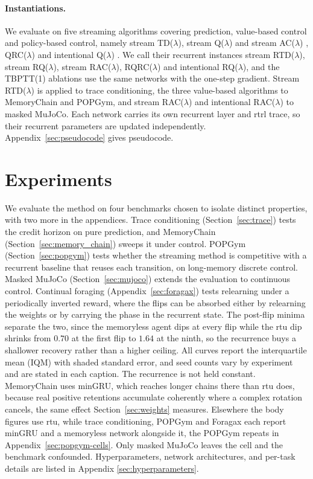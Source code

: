 \documentclass{article}
\begin{document}
\paragraph{Instantiations.} We evaluate on five streaming algorithms covering prediction,
value-based control and policy-based control, namely stream TD($\lambda$), stream Q($\lambda$) and
stream AC($\lambda$) \citep{elsayed2024streaming}, QRC($\lambda$) \citep{elelimy2025deep} and
intentional Q($\lambda$) \citep{sharifnassab2026intentional}. We call their recurrent instances
stream RTD($\lambda$), stream RQ($\lambda$), stream RAC($\lambda$), RQRC($\lambda$) and
intentional RQ($\lambda$), and the TBPTT(1) ablations use the same networks with the one-step
gradient.
Stream RTD($\lambda$) is applied to trace conditioning, the three value-based algorithms to
MemoryChain and POPGym, and stream
RAC($\lambda$) and intentional RAC($\lambda$) to masked MuJoCo. Each network carries its own recurrent layer and \gls{rtrl} trace, so their recurrent
parameters are updated independently. Appendix~\ref{sec:pseudocode} gives pseudocode.

\section{Experiments}
\label{sec:experiments}
 
We evaluate the method on four benchmarks chosen to isolate distinct properties, with two more in the appendices.
Trace conditioning (Section~\ref{sec:trace}) tests the credit horizon on pure prediction, and MemoryChain (Section~\ref{sec:memory_chain}) sweeps it under control.
POPGym (Section~\ref{sec:popgym}) tests whether the streaming method is competitive with a recurrent baseline that reuses each transition, on long-memory discrete control.
Masked MuJoCo (Section~\ref{sec:mujoco}) extends the evaluation to continuous control.
Continual foraging (Appendix~\ref{sec:foragax}) tests relearning under a periodically inverted reward, where the flips can be absorbed either by relearning the weights or by carrying the phase in the recurrent state. The post-flip minima separate the two, since the memoryless agent dips at every flip while the \gls{rtu} dip shrinks from $0.70$ at the first flip to $1.64$ at the ninth, so the recurrence buys a shallower recovery rather than a higher ceiling.
All curves report the interquartile mean (IQM) with shaded standard error, and seed counts vary by experiment and are stated in each caption. The recurrence is not held constant. MemoryChain uses minGRU, which reaches longer chains there than \gls{rtu} does, because real positive retentions accumulate coherently where a complex rotation cancels, the same effect Section~\ref{sec:weights} measures. Elsewhere the body figures use \gls{rtu}, while trace conditioning, POPGym and Foragax each report minGRU and a memoryless network alongside it, the POPGym repeats in Appendix~\ref{sec:popgym-cells}. Only masked MuJoCo leaves the cell and the benchmark confounded.
Hyperparameters, network architectures, and per-task details are listed in Appendix \ref{sec:hyperparameters}.
 
\end{document}
